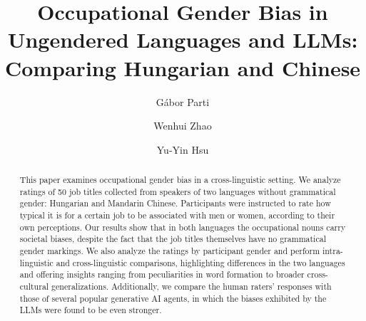 \documentclass[runningheads]{llncs}
\begin{document}
%
\title{Occupational Gender Bias in Ungendered Languages and LLMs: Comparing Hungarian and Chinese}
%
%

\author{Gábor Parti \and
Wenhui Zhao \and
Yu-Yin Hsu}

%
%

\maketitle %
%
\begin{abstract}
This paper examines occupational gender bias in a cross-linguistic setting. We analyze ratings of 50 job titles collected from speakers of two languages without grammatical gender: Hungarian and Mandarin Chinese. Participants were instructed to rate how typical it is for a certain job to be associated with men or women, according to their own perceptions.
Our results show that in both languages the occupational nouns carry societal biases, despite the fact that the job titles themselves have no grammatical gender markings. We also analyze the ratings by participant gender and perform intra-linguistic and cross-linguistic comparisons, highlighting differences in the two languages and offering insights ranging from peculiarities in word formation to broader cross-cultural generalizations.
Additionally, we compare the human raters' responses with those of several popular generative AI agents, in which the biases exhibited by the LLMs were found to be even stronger.

\end{abstract}
\end{document}
